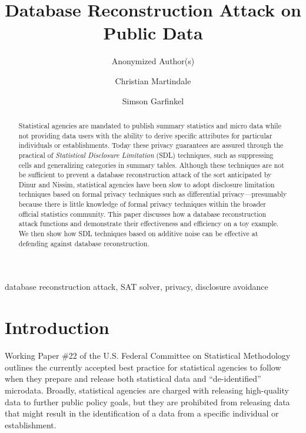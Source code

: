 \documentclass[runningheads]{llncs}
\begin{document}
\title{Database Reconstruction Attack on Public Data}
\ifanonymized
\author{Anonymized Author(s)}
\else
\author{Christian Martindale \and Simson Garfinkel}
\fi

\maketitle
\begin{abstract}
Statistical agencies are mandated to publish summary statistics and
micro data while not providing data users with the ability to derive
specific attributes for particular individuals or
establishments. Today these privacy guarantees are assured through the
practical of \emph{Statistical Disclosure Limitation} (SDL)
techniques, such as suppressing cells and generalizing categories in
summary tables. Although these techniques are not be sufficient to
prevent a database reconstruction attack of the sort anticipated by
Dinur and Nissim\cite{noise}, statistical agencies have been slow to
adopt disclosure limitation techniques based on formal privacy
techniques such as differential privacy---presumably because there is
little knowledge of formal privacy techniques within the broader
official statistics community.  This paper discusses how a database
reconstruction attack functions and demonstrate their effectiveness
and efficiency on a toy example. We then show how SDL techniques based
on additive noise can be effective at defending against database
reconstruction.
\end{abstract}

\begin{keywords}
database reconstruction attack, SAT solver, privacy, disclosure avoidance
\end{keywords}


\section{Introduction}
Working Paper \#22 of the U.S. Federal Committee on Statistical
Methodology\cite{workingpaper22} outlines the currently accepted best
practice for statistical agencies to follow when they prepare and
release both statistical data and ``de-identified''
microdata. Broadly, statistical agencies are charged with releasing
high-quality data to further public policy goals, but they are
prohibited from releasing data that might result in the identification
of a data from a specific individual or establishment.
\end{document}
